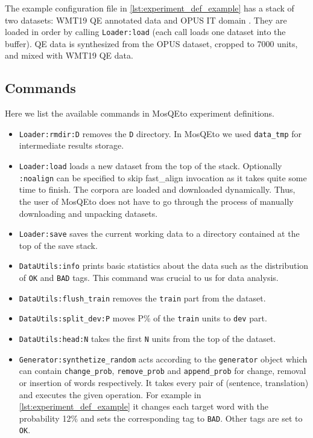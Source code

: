 \documentclass[12pt]{article}
\begin{document}
The example configuration file in \cref{lst:experiment_def_example} has a stack of two datasets: WMT19 QE annotated data and OPUS IT domain \cite{opus:2012}. They are loaded in order by calling \texttt{Loader:load} (each call loads one dataset into the buffer). QE data is synthesized from the OPUS dataset, cropped to 7000 units, and mixed with WMT19 QE data. 

\subsection{Commands}

Here we list the available commands in MosQEto experiment definitions.

\begin{itemize}
    \item \texttt{Loader:rmdir:D} removes the \texttt{D} directory. In MosQEto we used \texttt{data\_tmp} for intermediate results storage.
    
    \item \texttt{Loader:load} loads a new dataset from the top of the stack. Optionally \texttt{:noalign} can be specified to skip fast\_align invocation as it takes quite some time to finish. The corpora are loaded and downloaded dynamically. Thus, the user of MosQEto does not have to go through the process of manually downloading and unpacking datasets.
    
    \item \texttt{Loader:save} saves the current working data to a directory contained at the top of the save stack.
    
    \item \texttt{DataUtils:info} prints basic statistics about the data such as the distribution of \texttt{OK} and \texttt{BAD} tags. This command was crucial to us for data analysis.
    
    \item \texttt{DataUtils:flush\_train} removes the \texttt{train} part from the dataset.
    
    \item \texttt{DataUtils:split\_dev:P} moves P\% of the \texttt{train} units to \texttt{dev} part.
    
    \item \texttt{DataUtils:head:N} takes the first \texttt{N} units from the top of the dataset. 
    
    \item \texttt{Generator:synthetize\_random} acts according to the \texttt{generator} object which can contain \texttt{change\_prob}, \texttt{remove\_prob} and \texttt{append\_prob} for change, removal or insertion of words respectively. It takes every pair of (sentence, translation) and executes the given operation. For example in \cref{lst:experiment_def_example} it changes each target word with the probability 12\% and sets the corresponding tag to \texttt{BAD}. Other tags are set to \texttt{OK}.
    

\end{itemize}
\end{document}
